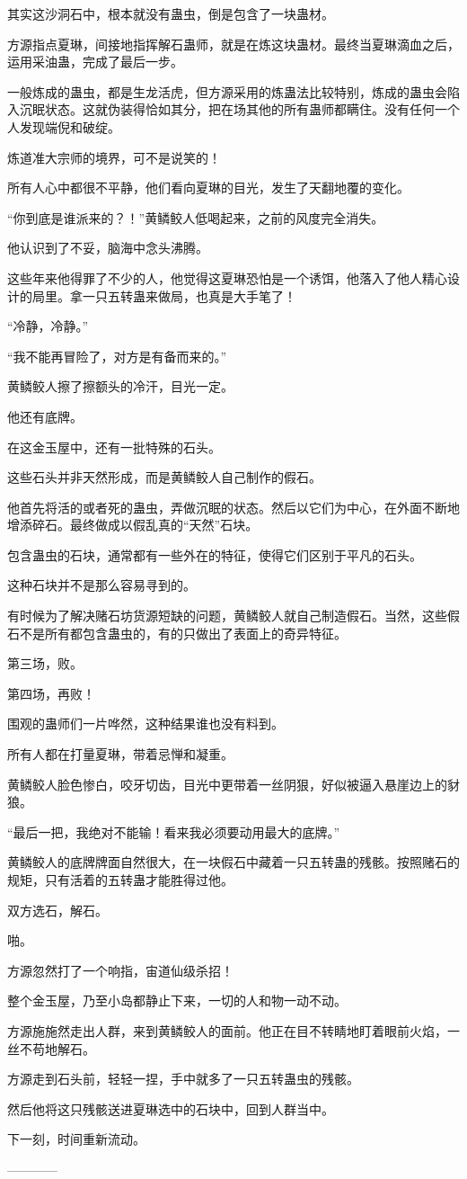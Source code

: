 \begin{this_body}
其实这沙洞石中，根本就没有蛊虫，倒是包含了一块蛊材。

方源指点夏琳，间接地指挥解石蛊师，就是在炼这块蛊材。最终当夏琳滴血之后，运用采油蛊，完成了最后一步。

一般炼成的蛊虫，都是生龙活虎，但方源采用的炼蛊法比较特别，炼成的蛊虫会陷入沉眠状态。这就伪装得恰如其分，把在场其他的所有蛊师都瞒住。没有任何一个人发现端倪和破绽。

炼道准大宗师的境界，可不是说笑的！

所有人心中都很不平静，他们看向夏琳的目光，发生了天翻地覆的变化。

“你到底是谁派来的？！”黄鳞鲛人低喝起来，之前的风度完全消失。

他认识到了不妥，脑海中念头沸腾。

这些年来他得罪了不少的人，他觉得这夏琳恐怕是一个诱饵，他落入了他人精心设计的局里。拿一只五转蛊来做局，也真是大手笔了！

“冷静，冷静。”

“我不能再冒险了，对方是有备而来的。”

黄鳞鲛人擦了擦额头的冷汗，目光一定。

他还有底牌。

在这金玉屋中，还有一批特殊的石头。

这些石头并非天然形成，而是黄鳞鲛人自己制作的假石。

他首先将活的或者死的蛊虫，弄做沉眠的状态。然后以它们为中心，在外面不断地增添碎石。最终做成以假乱真的“天然”石块。

包含蛊虫的石块，通常都有一些外在的特征，使得它们区别于平凡的石头。

这种石块并不是那么容易寻到的。

有时候为了解决赌石坊货源短缺的问题，黄鳞鲛人就自己制造假石。当然，这些假石不是所有都包含蛊虫的，有的只做出了表面上的奇异特征。

第三场，败。

第四场，再败！

围观的蛊师们一片哗然，这种结果谁也没有料到。

所有人都在打量夏琳，带着忌惮和凝重。

黄鳞鲛人脸色惨白，咬牙切齿，目光中更带着一丝阴狠，好似被逼入悬崖边上的豺狼。

“最后一把，我绝对不能输！看来我必须要动用最大的底牌。”

黄鳞鲛人的底牌牌面自然很大，在一块假石中藏着一只五转蛊的残骸。按照赌石的规矩，只有活着的五转蛊才能胜得过他。

双方选石，解石。

啪。

方源忽然打了一个响指，宙道仙级杀招！

整个金玉屋，乃至小岛都静止下来，一切的人和物一动不动。

方源施施然走出人群，来到黄鳞鲛人的面前。他正在目不转睛地盯着眼前火焰，一丝不苟地解石。

方源走到石头前，轻轻一捏，手中就多了一只五转蛊虫的残骸。

然后他将这只残骸送进夏琳选中的石块中，回到人群当中。

下一刻，时间重新流动。

------------

\end{this_body}

